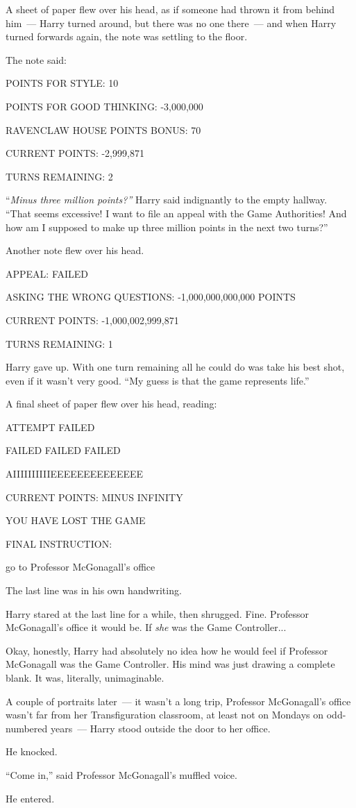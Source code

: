 A sheet of paper flew over his head, as if someone had thrown it from behind him~--- Harry turned around, but there was no one there~--- and when Harry turned forwards again, the note was settling to the floor.

The note said:

POINTS FOR STYLE: 10

POINTS FOR GOOD THINKING: -3,000,000

RAVENCLAW HOUSE POINTS BONUS: 70

CURRENT POINTS: -2,999,871

TURNS REMAINING: 2

``\emph{Minus three million points?''} Harry said indignantly to the empty hallway. ``That seems excessive! I want to file an appeal with the Game Authorities! And how am I supposed to make up three million points in the next two turns?''

Another note flew over his head.

APPEAL: FAILED

ASKING THE WRONG QUESTIONS: -1,000,000,000,000 POINTS

CURRENT POINTS: -1,000,002,999,871

TURNS REMAINING: 1

Harry gave up. With one turn remaining all he could do was take his best shot, even if it wasn't very good. ``My guess is that the game represents life.''

A final sheet of paper flew over his head, reading:

ATTEMPT FAILED

FAILED FAILED FAILED

AIIIIIIIIIIEEEEEEEEEEEEEE

CURRENT POINTS: MINUS INFINITY

YOU HAVE LOST THE GAME

FINAL INSTRUCTION:

go to Professor McGonagall's office

The last line was in his own handwriting.

Harry stared at the last line for a while, then shrugged. Fine. Professor McGonagall's office it would be. If \emph{she} was the Game Controller...

Okay, honestly, Harry had absolutely no idea how he would feel if Professor McGonagall was the Game Controller. His mind was just drawing a complete blank. It was, literally, unimaginable.

A couple of portraits later~--- it wasn't a long trip, Professor McGonagall's office wasn't far from her Transfiguration classroom, at least not on Mondays on odd-numbered years~--- Harry stood outside the door to her office.

He knocked.

``Come in,'' said Professor McGonagall's muffled voice.

He entered.
